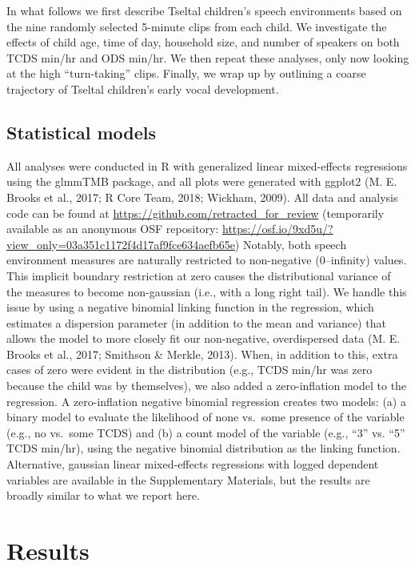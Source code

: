 \documentclass[floatsintext,man]{apa6}
\theoremstyle{definition}
\theoremstyle{definition}
\theoremstyle{definition}
\theoremstyle{remark}
\begin{document}
In what follows we first describe Tseltal children's speech environments
based on the nine randomly selected 5-minute clips from each child. We
investigate the effects of child age, time of day, household size, and
number of speakers on both TCDS min/hr and ODS min/hr. We then repeat
these analyses, only now looking at the high \enquote{turn-taking}
clips. Finally, we wrap up by outlining a coarse trajectory of Tseltal
children's early vocal development.

\subsection{Statistical models}\label{statistical-models}

All analyses were conducted in R with generalized linear mixed-effects
regressions using the glmmTMB package, and all plots were generated with
ggplot2 (M. E. Brooks et al., 2017; R Core Team, 2018; Wickham, 2009).
All data and analysis code can be found at
\url{https://github.com/retracted_for_review} (temporarily available as
an anonymous OSF repository:
\url{https://osf.io/9xd5u/?view_only=03a351c1172f4d17af9fce634aefb65e})
Notably, both speech environment measures are naturally restricted to
non-negative (0--infinity) values. This implicit boundary restriction at
zero causes the distributional variance of the measures to become
non-gaussian (i.e., with a long right tail). We handle this issue by
using a negative binomial linking function in the regression, which
estimates a dispersion parameter (in addition to the mean and variance)
that allows the model to more closely fit our non-negative,
overdispersed data (M. E. Brooks et al., 2017; Smithson \& Merkle,
2013). When, in addition to this, extra cases of zero were evident in
the distribution (e.g., TCDS min/hr was zero because the child was by
themselves), we also added a zero-inflation model to the regression. A
zero-inflation negative binomial regression creates two models: (a) a
binary model to evaluate the likelihood of none vs.~some presence of the
variable (e.g., no vs.~some TCDS) and (b) a count model of the variable
(e.g., \enquote{3} vs. \enquote{5} TCDS min/hr), using the negative
binomial distribution as the linking function. Alternative, gaussian
linear mixed-effects regressions with logged dependent variables are
available in the Supplementary Materials, but the results are broadly
similar to what we report here.

\section{Results}\label{results}
\end{document}
